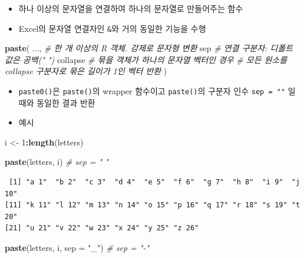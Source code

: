 \documentclass[
  11pt,
]{krantz}
\newenvironment{Shaded}{\begin{snugshade}}{\end{snugshade}}
\newcommand{\CommentTok}[1]{\textcolor[rgb]{0.37,0.37,0.37}{\textit{#1}}}
\newcommand{\DataTypeTok}[1]{\textcolor[rgb]{0.27,0.27,0.27}{#1}}
\newcommand{\DecValTok}[1]{\textcolor[rgb]{0.06,0.06,0.06}{#1}}
\newcommand{\KeywordTok}[1]{\textcolor[rgb]{0.27,0.27,0.27}{\textbf{#1}}}
\newcommand{\NormalTok}[1]{#1}
\newcommand{\OperatorTok}[1]{\textcolor[rgb]{0.43,0.43,0.43}{\textbf{#1}}}
\newcommand{\StringTok}[1]{\textcolor[rgb]{0.5,0.5,0.5}{#1}}
\providecommand{\tightlist}{%
  \setlength{\itemsep}{0pt}\setlength{\parskip}{0pt}}
\begin{document}
\begin{itemize}
\tightlist
\item
  하나 이상의 문자열을 연결하여 하나의 문자열로 만들어주는 함수
\item
  Excel의 문자열 연결자인 \texttt{\&}와 거의 동일한 기능을 수행
\end{itemize}

\footnotesize

\begin{Shaded}
\begin{Highlighting}[]
\KeywordTok{paste}\NormalTok{(}
\NormalTok{  ..., }\CommentTok{# 한 개 이상의 R 객체. 강제로 문자형 변환}
\NormalTok{  sep  }\CommentTok{# 연결 구분자: 디폴트 값은 공백(" ")}
\NormalTok{  collapse }\CommentTok{# 묶을 객체가 하나의 문자열 벡터인 경우}
           \CommentTok{# 모든 원소를 collapse 구분자로 묶은 길이가 1인 벡터 반환}
\NormalTok{)}
\end{Highlighting}
\end{Shaded}

\normalsize

\begin{itemize}
\tightlist
\item
  \texttt{paste0()}은 \texttt{paste()}의 wrapper 함수이고 \texttt{paste()}의 구분자 인수 \texttt{sep\ =\ ""} 일 때와 동일한 결과 반환
\item
  예시
\end{itemize}

\footnotesize

\begin{Shaded}
\begin{Highlighting}[]
\NormalTok{i <-}\StringTok{ }\DecValTok{1}\OperatorTok{:}\KeywordTok{length}\NormalTok{(letters)}

\KeywordTok{paste}\NormalTok{(letters, i) }\CommentTok{# sep = " "}
\end{Highlighting}
\end{Shaded}

\begin{verbatim}
 [1] "a 1"  "b 2"  "c 3"  "d 4"  "e 5"  "f 6"  "g 7"  "h 8"  "i 9"  "j 10"
[11] "k 11" "l 12" "m 13" "n 14" "o 15" "p 16" "q 17" "r 18" "s 19" "t 20"
[21] "u 21" "v 22" "w 23" "x 24" "y 25" "z 26"
\end{verbatim}

\begin{Shaded}
\begin{Highlighting}[]
\KeywordTok{paste}\NormalTok{(letters, i, }\DataTypeTok{sep =} \StringTok{"_"}\NormalTok{) }\CommentTok{# sep = "-"}
\end{Highlighting}
\end{Shaded}
\end{document}
